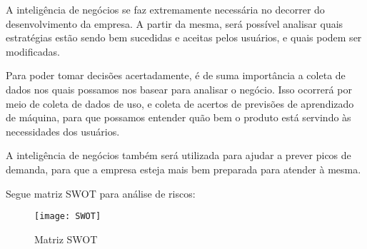 A inteligência de negócios se faz extremamente necessária no decorrer do desenvolvimento da empresa. A partir da mesma, será possível analisar quais estratégias estão sendo bem sucedidas e aceitas pelos usuários, e quais podem ser modificadas.

Para poder tomar decisões acertadamente, é de suma importância a coleta de dados nos quais possamos nos basear para analisar o negócio. Isso ocorrerá por meio de coleta de dados de uso, e coleta de acertos de previsões de aprendizado de máquina, para que possamos entender quão bem o produto está servindo às necessidades dos usuários.

A inteligência de negócios também será utilizada para ajudar a prever picos de demanda, para que a empresa esteja mais bem preparada para atender à mesma.

Segue matriz SWOT para análise de riscos:

\begin{figure}[htb]
	\caption{\label{fig:SWOT}Matriz SWOT}
	\begin{center}
		\texttt{[image: SWOT]}
	\end{center}
\end{figure}